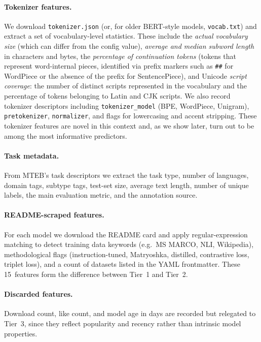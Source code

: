 \documentclass[11pt,a4paper,twocolumn]{article}
\begin{document}
\paragraph{Tokenizer features.}
We download \texttt{tokenizer.json} (or, for older BERT-style models, \texttt{vocab.txt}) and extract a set of vocabulary-level statistics.
These include the \emph{actual vocabulary size} (which can differ from the config value), \emph{average and median subword length} in characters and bytes, the \emph{percentage of continuation tokens} (tokens that represent word-internal pieces, identified via prefix markers such as \texttt{\#\#} for WordPiece or the absence of the \texttt{\textunderscore} prefix for SentencePiece), and Unicode \emph{script coverage}: the number of distinct scripts represented in the vocabulary and the percentage of tokens belonging to Latin and CJK scripts.
We also record tokenizer descriptors including \texttt{tokenizer\_model} (BPE, WordPiece, Unigram), \texttt{pretokenizer}, \texttt{normalizer}, and flags for lowercasing and accent stripping.
These tokenizer features are novel in this context and, as we show later, turn out to be among the most informative predictors.

\paragraph{Task metadata.}
From MTEB's task descriptors we extract the task type, number of languages, domain tags, subtype tags, test-set size, average text length, number of unique labels, the main evaluation metric, and the annotation source.

\paragraph{README-scraped features.}
For each model we download the README card and apply regular-expression matching to detect training data keywords (e.g.\ MS MARCO, NLI, Wikipedia), methodological flags (instruction-tuned, Matryoshka, distilled, contrastive loss, triplet loss), and a count of datasets listed in the YAML frontmatter.
These 15~features form the difference between Tier~1 and Tier~2.

\paragraph{Discarded features.}
Download count, like count, and model age in days are recorded but relegated to Tier~3, since they reflect popularity and recency rather than intrinsic model properties.
\end{document}
